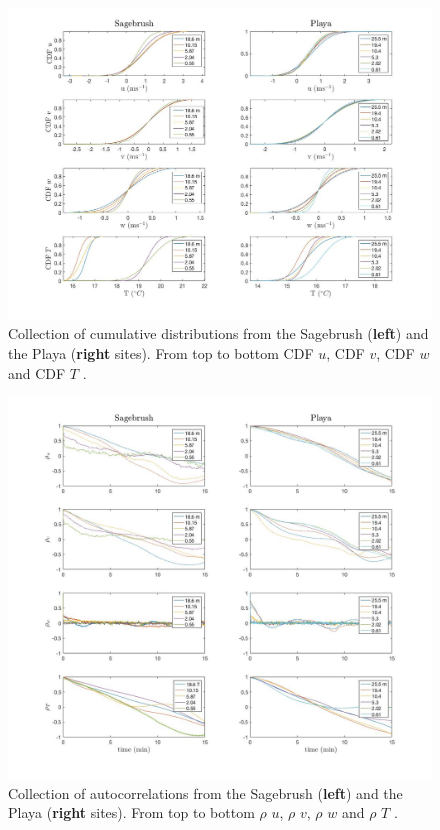 \documentclass[]{article}
\begin{document}
\begin{figure}
\centering
\includegraphics[width=\textwidth]{cdf}
	\caption{Collection of cumulative distributions from the Sagebrush (\textbf{left}) and the Playa (\textbf{right} sites). From top to bottom CDF $u$, CDF $v$,  CDF $w$ and CDF $T$ . }
\label{fig:cdf}
\end{figure}
\begin{figure}
	\centering
	\includegraphics[width=\textwidth]{auto_corr_fig}
	\caption{Collection of autocorrelations from the Sagebrush (\textbf{left}) and the Playa (\textbf{right} sites). From top to bottom $\rho$ $u$, $\rho$ $v$,  $\rho$ $w$ and $\rho$ $T$ . }
	\label{fig:autocorr}
\end{figure}
\end{document}

